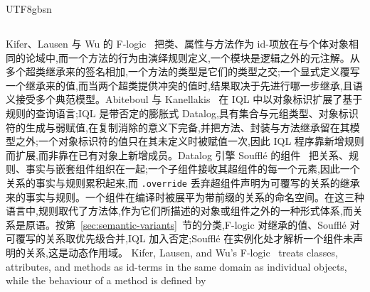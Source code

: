\begin{CJK*}{UTF8}{gbsn}
\subsection{}

\paragraph{}
\ifPaperChinese
Kifer、Lausen 与 Wu 的 F-logic~\cite{kifer1995-frame-logic} 把类、属性与方法作为 id-项放在与个体对象相同的论域中,而一个方法的行为由演绎规则定义,一个模块是逻辑之外的元注解。从多个超类继承来的签名相加,一个方法的类型是它们的类型之交;一个显式定义覆写一个继承来的值,而当两个超类提供冲突的值时,结果取决于先进行哪一步继承,且语义接受多个典范模型。Abiteboul 与 Kanellakis~\cite{abiteboul1989-object-identity-query-primitive, abiteboul1998-object-identity-jacm} 在 IQL 中以对象标识扩展了基于规则的查询语言;IQL 是带否定的膨胀式 Datalog,具有集合与元组类型、对象标识符的生成与弱赋值,在复制消除的意义下完备,并把方法、封装与方法继承留在其模型之外;一个对象标识符的值只在其未定义时被赋值一次,因此 IQL 程序靠新增规则而扩展,而非靠在已有对象上新增成员。Datalog 引擎 Souffl\'e 的组件~\cite{souffle-contributors-components} 把关系、规则、事实与嵌套组件组织在一起;一个子组件接收其超组件的每一个元素,因此一个关系的事实与规则累积起来,而 \texttt{.override} 丢弃超组件声明为可覆写的关系的继承来的事实与规则。一个组件在编译时被展平为带前缀的关系的命名空间。在这三种语言中,规则取代了方法体,作为它们所描述的对象或组件之外的一种形式体系,而关系是原语。按第~\ref{sec:semantic-variants}~节的分类,F-logic 对继承的值、Soufflé 对可覆写的关系取优先级合并,IQL 加入否定;Soufflé 在实例化处才解析一个组件未声明的关系,这是动态作用域。
\else
Kifer, Lausen, and Wu's F-logic~\cite{kifer1995-frame-logic} treats
classes, attributes, and methods as id-terms in the same domain as
individual objects, while the behaviour of a method is defined by

\end{CJK*}
